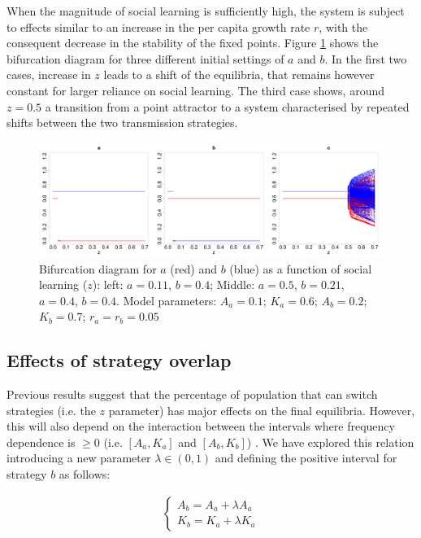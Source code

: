 \documentclass[preprint,authoryear]{elsarticle}
\begin{document}
When the magnitude of social learning is sufficiently high, the system is subject to effects similar to an increase in the per capita growth rate $r$, with the consequent decrease in the stability of the fixed points. Figure \ref{fig:bifurcationWithTransmission} shows the bifurcation diagram for three different initial settings of $a$ and $b$. In the first two cases, increase in $z$ leads to a shift of the equilibria, that remains however constant for larger reliance on social learning. The third case shows, around $z=0.5$ a transition from a point attractor to a system characterised by repeated shifts between the two transmission strategies. 
\begin{figure}[h!]
  \centering
      \includegraphics[width=\textwidth]{./figures/figure4.jpg}
  \caption{Bifurcation diagram for $a$ (red) and $b$ (blue) as a function of social learning ($z$): left: $a=0.11$, $b=0.4$; Middle: $a=0.5$, $b=0.21$, $a=0.4$, $b=0.4$. Model parameters:  $A_a=0.1$; $K_a=0.6$; $A_b=0.2$; $K_b=0.7$; $r_a=r_b=0.05$}
    \label{fig:bifurcationWithTransmission}
\end{figure}


\subsection{Effects of strategy overlap}

Previous results suggest that the percentage of population that can switch strategies (i.e. the $z$ parameter) has major effects on the final equilibria. However, this will also depend on the interaction between the intervals where frequency dependence is $\geq 0$ (i.e. $[A_a,K_a]$ and $[A_b,K_b]$) . We have explored this relation introducing a new parameter $\lambda \in (0,1)$ and defining the positive interval for strategy $b$ as follows:

\begin{align}
\label{eqOverlap}
\begin{cases}
A_b = A_a + \lambda A_a\\
K_b = K_a + \lambda K_a
\end{cases}
\end{align}
\end{document}
